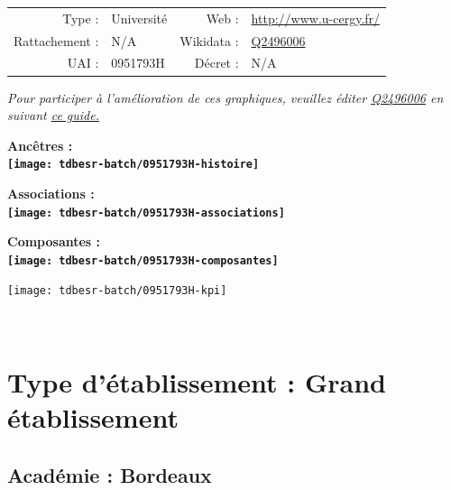 \documentclass[12pt,french,]{article}
\begin{document}
\begin{tabular*}{\textwidth}{rp{5cm}rl}  
\hline  
Type : & Université & Web : &\href{http://www.u-cergy.fr/}{http://www.u-cergy.fr/} \\  
Rattachement : & N/A & Wikidata : & \href{https://www.wikidata.org/entity/Q2496006}{Q2496006} \\  
UAI : & 0951793H & Décret : & N/A \\  
\hline  
\end{tabular*}

\textit{\scriptsize Pour participer à l'amélioration de ces graphiques, veuillez éditer  \href{https://www.wikidata.org/entity/Q2496006}{Q2496006}  en suivant \href{https://github.com/cpesr/wikidataESR/blob/master/Rmd/wikidataESR.md}{ce guide.}}

\vspace{1cm}  
\begin{minipage}[b]{0.50\textwidth}\begin{center} \bf Ancêtres : \\  
\texttt{[image: tdbesr-batch/0951793H-histoire]} \end{center}\end{minipage}\begin{minipage}[b]{0.50\textwidth}\begin{center} \bf Associations : \\  
\texttt{[image: tdbesr-batch/0951793H-associations]} \end{center}\end{minipage}

\hrulefill

\begin{center} \bf Composantes : \\  
\texttt{[image: tdbesr-batch/0951793H-composantes]} \end{center}

\begin{center}\texttt{[image: tdbesr-batch/0951793H-kpi]} \end{center}\checkoddpage

\ifoddpage ~\newpage \fi   

\hypertarget{type-duxe9tablissement-grand-uxe9tablissement}{%
\section{Type d'établissement : Grand
établissement}\label{type-duxe9tablissement-grand-uxe9tablissement}}

\hypertarget{acaduxe9mie-bordeaux-1}{%
\subsection{Académie : Bordeaux}\label{acaduxe9mie-bordeaux-1}}
\end{document}
